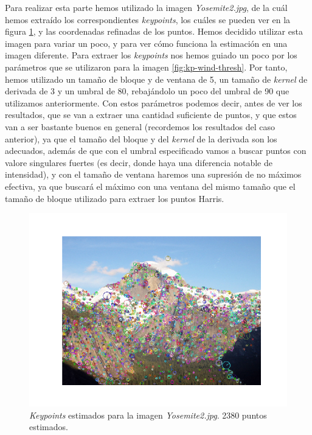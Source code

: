 \documentclass[11pt,a4paper]{article}
\begin{document}
Para realizar esta parte hemos utilizado la imagen \textit{Yosemite2.jpg}, de la cuál hemos extraído
los correspondientes \textit{keypoints}, los cuáles se pueden ver en la figura \ref{fig:kp-yos2},
y las coordenadas refinadas de los puntos. Hemos decidido
utilizar esta imagen para variar un poco, y para ver cómo funciona la estimación en una imagen
diferente. Para extraer los \textit{keypoints} nos hemos guiado un poco por los parámetros
que se utilizaron para la imagen \ref{fig:kp-wind-thresh}. Por tanto, hemos utilizado un tamaño de bloque
y de ventana de 5, un tamaño de \textit{kernel} de derivada de 3 y un umbral de 80, rebajándolo un poco
del umbral de 90 que utilizamos anteriormente. Con estos parámetros podemos decir, antes
de ver los resultados, que se van a extraer una cantidad suficiente de puntos, y que estos van a ser
bastante buenos en general (recordemos los resultados del caso anterior),
ya que el tamaño del bloque y del \textit{kernel} de la derivada son los adecuados, además de que
con el umbral especificado vamos a buscar puntos con valore singulares fuertes (es decir, donde
haya una diferencia notable de intensidad), y con el tamaño de ventana haremos una supresión de no
máximos efectiva, ya que buscará el máximo con una ventana del mismo tamaño que el tamaño de bloque
utilizado para extraer los puntos Harris.

\begin{figure}[H]
	\centering
	\includegraphics[scale=0.6]{img/kp2}
	\caption{\textit{Keypoints} estimados para la imagen \textit{Yosemite2.jpg}. 2380 puntos estimados.}
	\label{fig:kp-yos2}
\end{figure}
\end{document}
